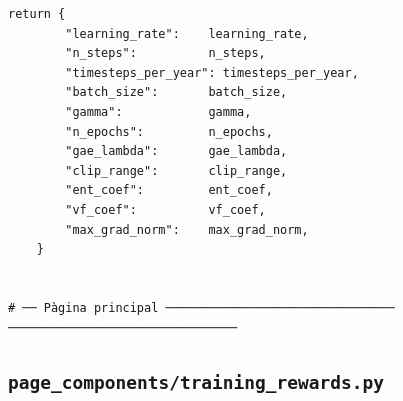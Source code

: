 \documentclass[10pt,a4paper]{article}
\begin{document}
\begin{lstlisting}[style=studioPython,caption={page\_components/training\_agent.py},label={lst:page-components-training-agent-py}]
    return {
        "learning_rate":    learning_rate,
        "n_steps":          n_steps,
        "timesteps_per_year": timesteps_per_year,
        "batch_size":       batch_size,
        "gamma":            gamma,
        "n_epochs":         n_epochs,
        "gae_lambda":       gae_lambda,
        "clip_range":       clip_range,
        "ent_coef":         ent_coef,
        "vf_coef":          vf_coef,
        "max_grad_norm":    max_grad_norm,
    }


# ── Pàgina principal ──────────────────────────────── ────────────────────────────────
\end{lstlisting}


\subsection{\texorpdfstring{\texttt{page\_components/training\_rewards.py}}{page\_components/training\_rewards.py}}
\end{document}
